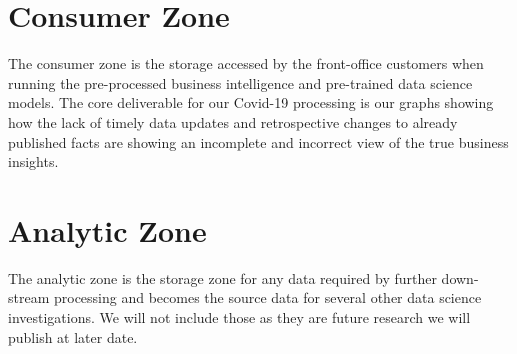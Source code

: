\section{Consumer Zone}


The consumer zone is the storage accessed by the front-office customers when running the pre-processed business intelligence and pre-trained data science models. The core deliverable for our Covid-19 processing is our graphs showing how the lack of timely data updates and retrospective changes to already published facts are showing an incomplete and incorrect view of the true business insights.


\section{Analytic Zone}


The analytic zone is the storage zone for any data required by further down-stream processing and becomes the source data for several other data science investigations. We will not include those as they are future research we will publish at later date.